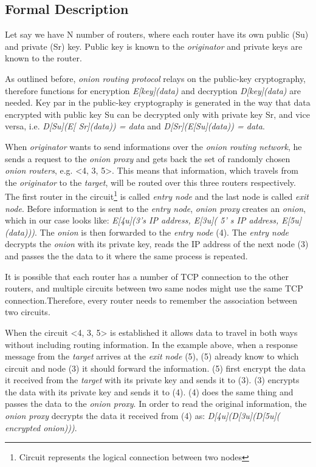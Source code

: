 \documentclass{acm_proc_article-sp}
\begin{document}
\subsection{Formal Description}

Let say we have N number of routers, where each router have its own public (Su) and private (Sr) key. Public key is known to the \textit{originator} and private keys are known to the router. \cite{cite4}

As outlined before, \textit{onion routing protocol} relays on the public-key cryptography, therefore functions for encryption \textit{E[key](data)} and decryption \textit{D[key](data)} are needed. Key par in the public-key cryptography is generated in the way that data encrypted with public key Su can be decrypted only with private key Sr, and vice versa, i.e. \textit{D[Su](E[ Sr](data)) = data} and \textit{D[Sr](E[Su](data)) = data}. \cite{cite4}

When \textit{originator} wants to send informations over the \textit{onion routing network}, he sends a request to the \textit{onion proxy} and gets back the set of randomly chosen \textit{onion routers}, e.g. <4, 3, 5>. This means that information, which travels from the \textit{originator} to the \textit{target}, will be routed over this three routers respectively. The first router in the circuit\footnote{Circuit represents the logical connection between two nodes} is called \textit{entry node} and the last node is called \textit{exit node}. Before information is sent to the \textit{entry node}, \textit{onion proxy} creates an \textit{onion}, which in our case looks like: \textit{E[4u](3's IP address, E[3u]( 5' s IP address, E[5u](data)))}. The \textit{onion} is then forwarded to the \textit{entry node} (4). The \textit{entry node} decrypts the \textit{onion} with its private key, reads the IP address of the next node (3) and passes the the data to it where the same process is repeated. \cite{cite4}

It is possible that each router has a number of TCP connection to the other routers, and multiple circuits between two same nodes might use the same TCP connection.Therefore, every router needs to remember the association between two circuits. \cite{cite4}

When the circuit <4, 3, 5> is established it allows data to travel in both ways without including routing information. In the example above, when a response message from the \textit{target} arrives at the \textit{exit node} (5), (5) already know to which circuit and node (3) it should forward the information. (5) first encrypt the data it received from the \textit{target } with its private key and sends it to (3). (3) encrypts the data with its private key and sends it to (4). (4) does the same thing and passes the data to the \textit{onion proxy}. In order to read the original information, the \textit{onion proxy} decrypts the data it received from (4) as: \textit{D[4u](D[3u](D[5u]( encrypted onion)))}. \cite{cite4}
\end{document}
